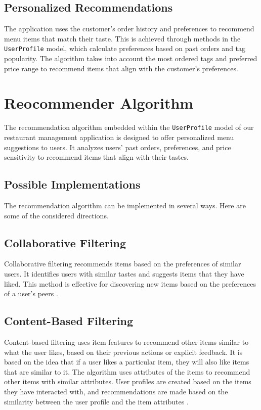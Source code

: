 \subsection{Personalized Recommendations}
The application uses the customer's order history and preferences to recommend menu items that match their taste. This is achieved through methods in the \texttt{UserProfile} model, which calculate preferences based on past orders and tag popularity. The algorithm takes into account the most ordered tags and preferred price range to recommend items that align with the customer's preferences.

\section{Reocommender Algorithm}
The recommendation algorithm embedded within the \texttt{UserProfile} model of our restaurant management application is designed to offer personalized menu suggestions to users. It analyzes users' past orders, preferences, and price sensitivity to recommend items that align with their tastes.

\subsection{Possible Implementations}
The recommendation algorithm can be implemented in several ways. Here are some of the considered directions.

\subsection*{Collaborative Filtering}
Collaborative filtering recommends items based on the preferences of similar users. It identifies users with similar tastes and suggests items that they have liked. This method is effective for discovering new items based on the preferences of a user's peers \cite{26} \cite{27}.

\subsection*{Content-Based Filtering}
Content-based filtering uses item features to recommend other items similar to what the user likes, based on their previous actions or explicit feedback. It is based on the idea that if a user likes a particular item, they will also like items that are similar to it. The algorithm uses attributes of the items to recommend other items with similar attributes. User profiles are created based on the items they have interacted with, and recommendations are made based on the similarity between the user profile and the item attributes \cite{29}.

